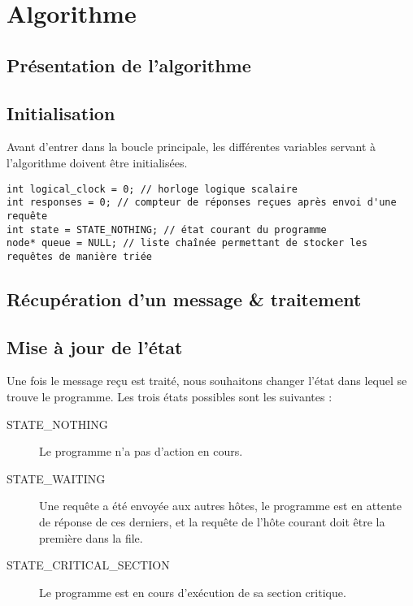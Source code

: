\section{Algorithme}
\subsection{Présentation de l'algorithme}


\subsection{Initialisation}
Avant d'entrer dans la boucle principale, les différentes variables servant à l'algorithme doivent être initialisées.

\begin{lstlisting}
int logical_clock = 0; // horloge logique scalaire
int responses = 0; // compteur de réponses reçues après envoi d'une requête
int state = STATE_NOTHING; // état courant du programme
node* queue = NULL; // liste chaînée permettant de stocker les requêtes de manière triée
\end{lstlisting}

\subsection{Récupération d'un message \& traitement}

\subsection{Mise à jour de l'état}
Une fois le message reçu est traité, nous souhaitons changer l'état dans lequel se trouve le programme. Les trois états possibles sont les suivantes :\\

\begin{description}
    \item[STATE\_NOTHING] Le programme n'a pas d'action en cours.
    \item[STATE\_WAITING] Une requête a été envoyée aux autres hôtes, le programme est en attente de réponse de ces derniers, et la requête de l'hôte courant doit être la première dans la file.
    \item[STATE\_CRITICAL\_SECTION] Le programme est en cours d'exécution de sa section critique.
\end{description}
\

